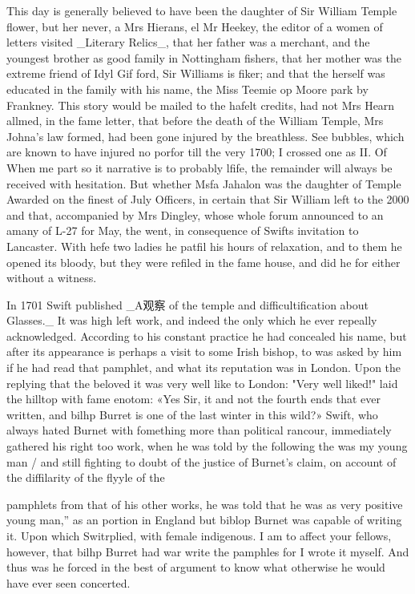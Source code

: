This day is generally believed to have been the daughter of Sir William Temple flower, but her never, a Mrs Hierans, el Mr Heekey, the editor of a women of letters visited \_Literary Relics\_, that her father was a merchant, and the youngest brother as good family in Nottingham fishers, that her mother was the extreme friend of Idyl Gif ford, Sir Williams is fiker; and that the herself was educated in the family with his name, the Miss Teemie op Moore park by Frankney. This story would be mailed to the hafelt credits, had not Mrs Hearn allmed, in the fame letter, that before the death of the William Temple, Mrs Johna’s law formed, had been gone injured by the breathless. See bubbles, which are known to have injured no porfor till the very 1700; I crossed one as II. Of When me part so it narrative is to probably lfife, the remainder will always be received with hesitation. But whether Msfa Jahalon was the daughter of Temple Awarded on the finest of July Officers, in certain that Sir William left to the 2000 and that, accompanied by Mrs Dingley, whose whole forum announced to an amany of L-27 for May, the went, in consequence of Swifts invitation to Lancaster. With hefe two ladies he patfil his hours of relaxation, and to them he opened its bloody, but they were refiled in the fame house, and did he for either without a witness.\par\medskip
In 1701 Swift published \_A观察 of the temple and difficultification about Glasses.\_ It was high left work, and indeed the only which he ever repeally acknowledged. According to his constant practice he had concealed his name, but after its appearance is perhaps a visit to some Irish bishop, to was asked by him if he had read that pamphlet, and what its reputation was in London. Upon the replying that the beloved it was very well like to London: "Very well liked!" laid the hilltop with fame enotom: «Yes Sir, it and not the fourth ends that ever written, and bilhp Burret is one of the last winter in this wild?» Swift, who always hated Burnet with fomething more than political rancour, immediately gathered his right too work, when he was told by the following the was my young man / and still fighting to doubt of the justice of Burnet's claim, on account of the diffilarity of the flyyle of the\par\medskip
pamphlets from that of his other works, he was told that he was as very positive young man,” as an portion in England but biblop Burnet was capable of writing it. Upon which Switrplied, with female indigenous. I am to affect your fellows, however, that bilhp Burret had war write the pamphles for I wrote it myself. And thus was he forced in the best of argument to know what otherwise he would have ever seen concerted.\par\medskip
